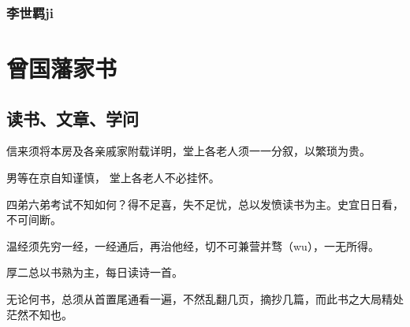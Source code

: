 \documentclass[UTF8,a4paper,8pt]{ctexbook}
\begin{document}
		\subsection{李世羁ji}
	
\chapter{曾国藩家书}
	\section{读书、文章、学问}
		信来须将本房及各亲戚家附载详明，堂上各老人须一一分叙，以繁琐为贵。
		
		男等在京自知谨慎， 堂上各老人不必挂怀。
		
		四弟六弟考试不知如何？得不足喜，失不足忧，总以发愤读书为主。史宜日日看，不可间断。
		
		温经须先穷一经，一经通后，再治他经，切不可兼营并骛（wu），一无所得。
		
		厚二总以书熟为主，每日读诗一首。
		
		无论何书，总须从首置尾通看一遍，不然乱翻几页，摘抄几篇，而此书之大局精处茫然不知也。
		
		
\end{document}
